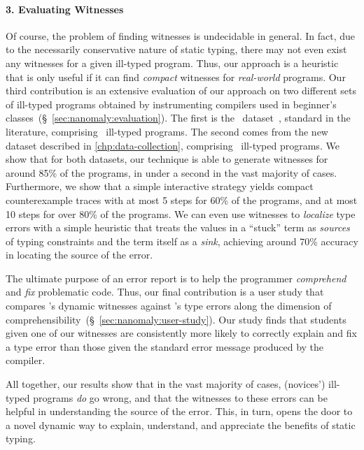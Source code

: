 \paragraph{3. Evaluating Witnesses}
%
Of course, the problem of finding witnesses is
undecidable in general. In fact, due to the necessarily
conservative nature of static typing, there
may not even exist any witnesses for a given
ill-typed program.
%
Thus, our approach is a heuristic that is only useful
if it can find \emph{compact} witnesses for
\emph{real-world} programs.
%
Our third contribution is an extensive evaluation of our approach
on two different sets of ill-typed programs obtained by instrumenting
compilers used in beginner's classes~(\S~\ref{sec:nanomaly:evaluation}).
%
The first is the \uwbench\ dataset~\cite{Lerner2007-dt}, standard in the
literature, comprising \uwsize\ ill-typed programs.
%
The second comes from the new dataset described in \autoref{chp:data-collection}, comprising \ucsdsize\
ill-typed programs.
%
We show that for both datasets, our technique is able to generate
witnesses for around 85\% of the programs, in under a second in the
vast majority of cases.
%
Furthermore, we show that a simple interactive strategy yields
compact counterexample traces with at most 5 steps for 60\%
of the programs, and at most 10 steps for over 80\% of the programs.
%
We can even use witnesses to \emph{localize} type errors with a simple
heuristic that treats the values in a ``stuck'' term as \emph{sources}
of typing constraints and the term itself as a \emph{sink},
achieving around 70\% accuracy in locating the source of the error.

The ultimate purpose of an error report is to help the programmer
\emph{comprehend} and \emph{fix} problematic code.
%
Thus, our final contribution is a user study that compares \toolname's
dynamic witnesses against \ocaml's type errors along the dimension of
comprehensibility~(\S~\ref{sec:nanomaly:user-study}).
%
Our study finds that students given one of our witnesses are
consistently more likely to correctly explain and fix a type
error than those given the standard error message produced by
the \ocaml compiler.


%
%
%
%
%
%

\smallskip
All together, our results show that in the vast majority of cases, (novices') ill-typed
programs \emph{do} go wrong, and that the witnesses to these errors can be
helpful in understanding the source of the error. This, in turn, opens the
door to a novel dynamic way to explain, understand, and appreciate the
benefits of static typing.



